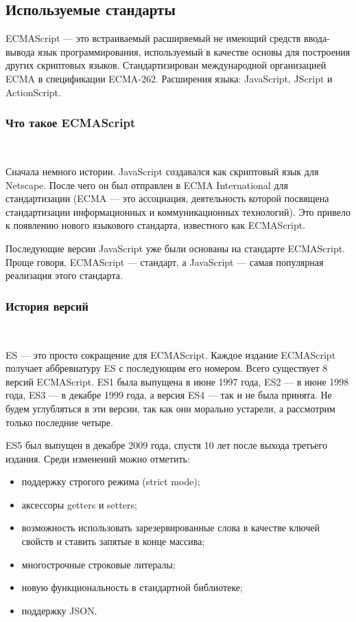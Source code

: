 \subsection{Используемые стандарты}
\label{sec:modeling:ecma}

ECMAScript — это встраиваемый расширяемый не имеющий средств ввода-вывода язык программирования, используемый в качестве основы для построения других скриптовых языков. Стандартизирован международной организацией ECMA в спецификации ECMA-262. Расширения языка: JavaScript, JScript и ActionScript.

\subsubsection{Что такое ECMAScript}
\

Сначала немного истории. JavaScript создавался как скриптовый язык для Netscape. После чего он был отправлен в ECMA International для стандартизации (ECMA — это ассоциация, деятельность которой посвящена стандартизации информационных и коммуникационных технологий). Это привело к появлению нового языкового стандарта, известного как ECMAScript.

Последующие версии JavaScript уже были основаны на стандарте ECMAScript. Проще говоря, ECMAScript — стандарт, а JavaScript — самая популярная реализация этого стандарта.

\subsubsection{История версий}
\

ES — это просто сокращение для ECMAScript. Каждое издание ECMAScript получает аббревиатуру ES с последующим его номером. Всего существует 8 версий ECMAScript. ES1 была выпущена в июне 1997 года, ES2 — в июне 1998 года, ES3 — в декабре 1999 года, а версия ES4 — так и не была принята. Не будем углубляться в эти версии, так как они морально устарели, а рассмотрим только последние четыре.

ES5 был выпущен в декабре 2009 года, спустя 10 лет после выхода третьего издания. Среди изменений можно отметить:

\begin{itemize}
    \item поддержку строгого режима (strict mode);
    \item аксессоры getters и setters;
    \item возможность использовать зарезервированные слова в качестве ключей свойств и ставить запятые в конце массива;
    \item многострочные строковые литералы;
    \item новую функциональность в стандартной библиотеке;
    \item поддержку JSON.
\end{itemize}

